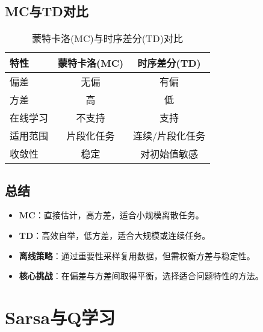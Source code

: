 \subsection{MC与TD对比}

\begin{table}[H]
\centering
\caption{蒙特卡洛(MC)与时序差分(TD)对比}
\begin{tabular}{lcc}
\toprule
\textbf{特性} & \textbf{蒙特卡洛(MC)} & \textbf{时序差分(TD)} \\
\midrule
偏差 & 无偏 & 有偏 \\
方差 & 高 & 低 \\
在线学习 & 不支持 & 支持 \\
适用范围 & 片段化任务 & 连续/片段化任务 \\
收敛性 & 稳定 & 对初始值敏感 \\
\bottomrule
\end{tabular}
\label{tab:mc_vs_td}
\end{table}

\subsection{总结}
\begin{itemize}
    \item \textbf{MC}：直接估计，高方差，适合小规模离散任务。
    \item \textbf{TD}：高效自举，低方差，适合大规模或连续任务。
    \item \textbf{离线策略}：通过重要性采样复用数据，但需权衡方差与稳定性。
    \item \textbf{核心挑战}：在偏差与方差间取得平衡，选择适合问题特性的方法。
\end{itemize}

\section{Sarsa与Q学习}
